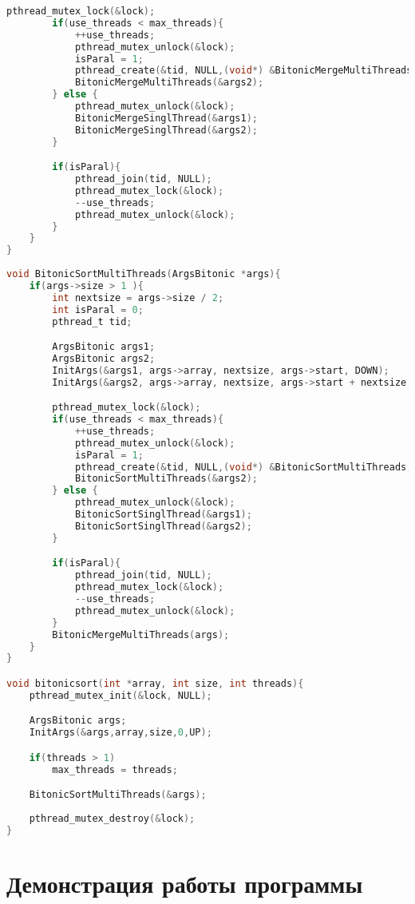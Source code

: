 \documentclass[pdf, unicode, 12pt, a4paper,oneside,fleqn]{article}
\begin{document}
\begin{lstlisting}[language=C]
        pthread_mutex_lock(&lock);
        if(use_threads < max_threads){ 
            ++use_threads;
            pthread_mutex_unlock(&lock);
            isParal = 1;
            pthread_create(&tid, NULL,(void*) &BitonicMergeMultiThreads, &args1);
            BitonicMergeMultiThreads(&args2);
        } else {
            pthread_mutex_unlock(&lock);
            BitonicMergeSinglThread(&args1);
            BitonicMergeSinglThread(&args2);
        }

        if(isParal){
            pthread_join(tid, NULL);
            pthread_mutex_lock(&lock);
            --use_threads;
            pthread_mutex_unlock(&lock);
        }
    }
}
    
void BitonicSortMultiThreads(ArgsBitonic *args){
    if(args->size > 1 ){
        int nextsize = args->size / 2;
        int isParal = 0;
        pthread_t tid;

        ArgsBitonic args1;
        ArgsBitonic args2;
        InitArgs(&args1, args->array, nextsize, args->start, DOWN);
        InitArgs(&args2, args->array, nextsize, args->start + nextsize, UP);

        pthread_mutex_lock(&lock);
        if(use_threads < max_threads){
            ++use_threads;
            pthread_mutex_unlock(&lock);
            isParal = 1;
            pthread_create(&tid, NULL,(void*) &BitonicSortMultiThreads, &args1);
            BitonicSortMultiThreads(&args2);
        } else {
            pthread_mutex_unlock(&lock);
            BitonicSortSinglThread(&args1);
            BitonicSortSinglThread(&args2);
        }

        if(isParal){
            pthread_join(tid, NULL);
            pthread_mutex_lock(&lock);
            --use_threads;
            pthread_mutex_unlock(&lock);
        }
        BitonicMergeMultiThreads(args);
    }
}

void bitonicsort(int *array, int size, int threads){
    pthread_mutex_init(&lock, NULL);

    ArgsBitonic args;
    InitArgs(&args,array,size,0,UP);

    if(threads > 1)
        max_threads = threads;

    BitonicSortMultiThreads(&args);
    
    pthread_mutex_destroy(&lock);
}
\end{lstlisting}

\section{Демонстрация работы программы}
\end{document}
